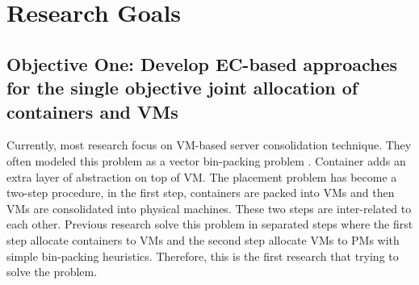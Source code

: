 \section{Research Goals}

\subsection{Objective One: Develop EC-based approaches for the single objective joint allocation of containers and VMs}

Currently, most research focus on VM-based server consolidation technique. They often modeled this problem as a vector bin-packing problem \cite{Zhang:2016cx}. Container adds an extra layer of abstraction on top of VM. The placement problem has become a two-step procedure, in the first step, containers are packed into VMs and then VMs are consolidated into physical machines. These two steps are inter-related to each other. Previous research \cite{Piraghaj:2015uf} solve this problem in separated steps where the first step allocate containers to VMs and the second step allocate VMs to PMs with simple bin-packing heuristics. Therefore, this is the first research that trying to solve the problem.

